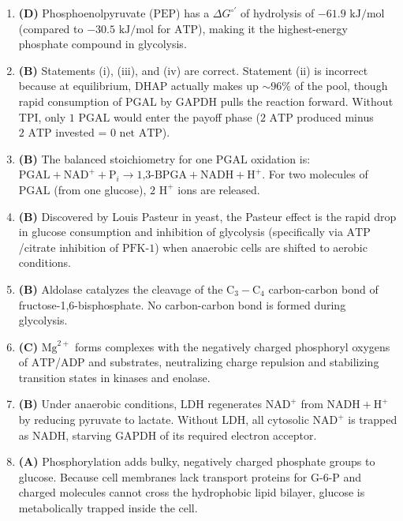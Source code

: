 \documentclass[11pt, a4paper]{article}
\begin{document}
\begin{enumerate}[label=\textbf{\arabic*.}]
\item \textbf{(D)} Phosphoenolpyruvate ($\text{PEP}$) has a $\Delta G^{\circ\prime}$ of hydrolysis of $-61.9\text{ kJ/mol}$ (compared to $-30.5\text{ kJ/mol}$ for $\text{ATP}$), making it the highest-energy phosphate compound in glycolysis.

\item \textbf{(B)} Statements (i), (iii), and (iv) are correct. Statement (ii) is incorrect because at equilibrium, $\text{DHAP}$ actually makes up $\sim 96\%$ of the pool, though rapid consumption of $\text{PGAL}$ by $\text{GAPDH}$ pulls the reaction forward. Without TPI, only $1\text{ PGAL}$ would enter the payoff phase ($2\text{ ATP}$ produced minus $2\text{ ATP}$ invested = $0\text{ net ATP}$).

\item \textbf{(B)} The balanced stoichiometry for one $\text{PGAL}$ oxidation is: $\text{PGAL} + \text{NAD}^+ + \text{P}_i \rightarrow \text{1,3-BPGA} + \text{NADH} + \text{H}^+$. For two molecules of $\text{PGAL}$ (from one glucose), $2\text{ H}^+$ ions are released.

\item \textbf{(B)} Discovered by Louis Pasteur in yeast, the Pasteur effect is the rapid drop in glucose consumption and inhibition of glycolysis (specifically via $\text{ATP}$/citrate inhibition of $\text{PFK-1}$) when anaerobic cells are shifted to aerobic conditions.

\item \textbf{(B)} Aldolase catalyzes the cleavage of the $\text{C}_3-\text{C}_4$ carbon-carbon bond of fructose-1,6-bisphosphate. No carbon-carbon bond is formed during glycolysis.

\item \textbf{(C)} $\text{Mg}^{2+}$ forms complexes with the negatively charged phosphoryl oxygens of $\text{ATP}$/$\text{ADP}$ and substrates, neutralizing charge repulsion and stabilizing transition states in kinases and enolase.

\item \textbf{(B)} Under anaerobic conditions, $\text{LDH}$ regenerates $\text{NAD}^+$ from $\text{NADH} + \text{H}^+$ by reducing pyruvate to lactate. Without $\text{LDH}$, all cytosolic $\text{NAD}^+$ is trapped as $\text{NADH}$, starving $\text{GAPDH}$ of its required electron acceptor.

\item \textbf{(A)} Phosphorylation adds bulky, negatively charged phosphate groups to glucose. Because cell membranes lack transport proteins for $\text{G-6-P}$ and charged molecules cannot cross the hydrophobic lipid bilayer, glucose is metabolically trapped inside the cell.


\end{enumerate}
\end{document}
